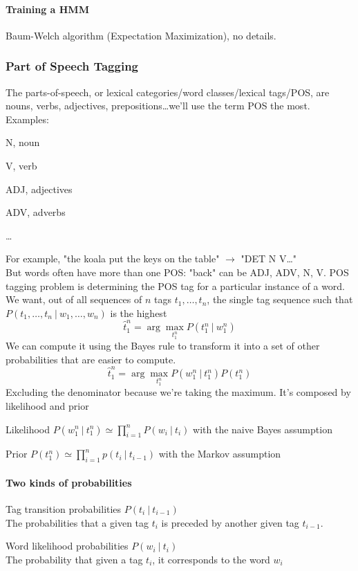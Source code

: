 \documentclass[10pt]{report}
\begin{document}
\paragraph{Training a HMM} Baum-Welch algorithm (Expectation Maximization), no details.
\subsubsection{Part of Speech Tagging} The parts-of-speech, or lexical categories/word classes/lexical tags/POS, are nouns, verbs, adjectives, prepositions\ldots we'll use the term POS the most. Examples:
\begin{list}{}{}
	\item N, noun
	\item V, verb
	\item ADJ, adjectives
	\item ADV, adverbs
	\item \ldots
\end{list}
For example, "the koala put the keys on the table" $\rightarrow$ "DET N V\ldots"\\
But words often have more than one POS: "back" can be ADJ, ADV, N, V. POS tagging problem is determining the POS tag for a particular instance of a word.\\
We want, out of all sequences of $n$ tags $t_1,\ldots,t_n$, the single tag sequence such that $P(t_1,\ldots,t_n\:|\:w_1,\ldots,w_n)$ is the highest $$\hat{t}_1^n=\arg\max_{t_1^n} P(t_1^n\:|\: w_1^n)$$
We can compute it using the Bayes rule to transform it into a set of other probabilities that are easier to compute.
$$\hat{t}_1^n=\arg\max_{t_1^n} P(w_1^n \:|\: t_1^n)P(t_1^n)$$
Excluding the denominator because we're taking the maximum. It's composed by likelihood and prior\begin{list}{}{}
	\item Likelihood $P(w_1^n \:|\: t_1^n) \simeq \prod_{i=1}^n P(w_i\:|\:t_i)$ with the naive Bayes assumption
	\item Prior $P(t_1^n)\simeq \prod_{i=1}^n p(t_i\:|\:t_{i-1})$ with the Markov assumption 
\end{list}
\paragraph{Two kinds of probabilities}
\begin{list}{}{}
	\item Tag transition probabilities $P(t_i\:|\:t_{i-1})$\\
	The probabilities that a given tag $t_i$ is preceded by another given tag $t_{i-1}$.
	\item Word likelihood probabilities $P(w_i\:|\:t_i)$\\
	The probability that given a tag $t_i$, it corresponds to the word $w_i$
\end{list}
\end{document}
